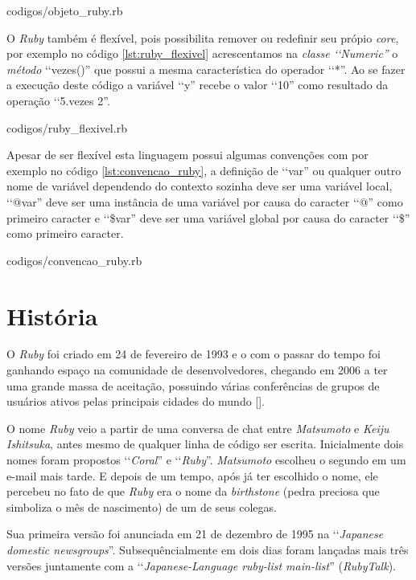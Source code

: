 
{codigos/objeto_ruby.rb}

O \emph{Ruby} também é flexível, pois possibilita remover ou redefinir seu própio \emph{core}, por
exemplo no código \ref{lst:ruby_flexivel} acrescentamos na \emph{classe ‘‘Numeric''}
o \emph{método} ‘‘vezes()'' que possui a mesma característica do operador ‘‘*''. Ao se fazer a execução
deste código a variável ‘‘y'' recebe o valor ‘‘10'' como resultado da operação ‘‘5.vezes 2''.


{codigos/ruby_flexivel.rb}

Apesar de ser flexível esta linguagem possui algumas convenções com por exemplo no código
\ref{lst:convencao_ruby}, a definição de ‘‘var'' ou qualquer outro nome de
variável dependendo do contexto sozinha deve ser uma variável local, ‘‘@var'' deve ser uma instância
de uma variável por causa do caracter ‘‘@'' como primeiro caracter e ‘‘\$var'' deve ser uma variável global
por causa do caracter ‘‘\$'' como primeiro caracter.


{codigos/convencao_ruby.rb}

\section{História}
\label{section:história_ruby}

O \emph{Ruby} foi criado em 24 de fevereiro de 1993 e o com o passar do tempo foi ganhando espaço na
comunidade de desenvolvedores, chegando em 2006 a ter uma grande massa de aceitação, possuindo várias
conferências de grupos de usuários ativos pelas principais cidades do mundo [].

O nome \emph{Ruby} veio a partir de uma conversa de chat entre \emph{Matsumoto} e \emph{Keiju Ishitsuka},
antes mesmo de qualquer linha de código ser escrita. Inicialmente dois nomes foram propostos ‘‘\emph{Coral}''
e ‘‘\emph{Ruby}''. \emph{Matsumoto} escolheu o segundo em um e-mail mais tarde. E depois de um tempo, após
já ter escolhido o nome, ele percebeu no fato de que \emph{Ruby} era o nome da \emph{birthstone} (pedra
preciosa que simboliza o mês de nascimento) de um de seus colegas.

Sua primeira versão foi anunciada em 21 de dezembro de 1995 na ‘‘\emph{Japanese domestic newsgroups}''.
Subsequêncialmente em dois dias foram lançadas mais três versões juntamente com a
‘‘\emph{Japanese-Language ruby-list main-list}'' (\emph{RubyTalk}).

